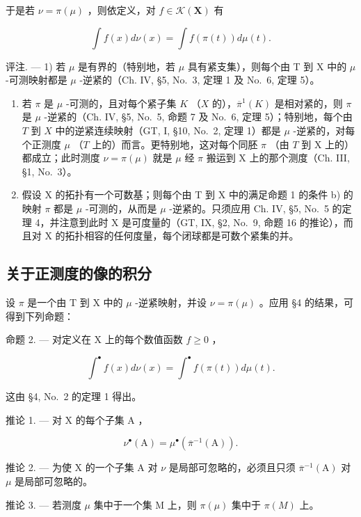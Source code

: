 于是若 \(\nu = \pi (\mu)\) ，则依定义，对 \(f\in \mathcal{K}(\mathbf{X})\) 有

\[
\int f (x) d \nu (x) = \int f (\pi (t)) d \mu (t).\tag{1}
\]

评注. --- 1) 若 \(\mu\) 是有界的（特别地，若 \(\mu\) 具有紧支集），则每个由 T 到 X 中的 \(\mu\) -可测映射都是 \(\mu\) -逆紧的（Ch. IV, §5, No.~3, 定理 1 及 No.~6, 定理 5）。

\begin{enumerate}
\def\labelenumi{\arabic{enumi})}
\setcounter{enumi}{1}
\item
  若 \(\pi\) 是 \(\mu\) -可测的，且对每个紧子集 \(K\) （\(X\) 的），\(\overline{\pi}^{1}(K)\) 是相对紧的，则 \(\pi\) 是 \(\mu\) -逆紧的（Ch. IV, §5, No.~5, 命题 7 及 No.~6, 定理 5）；特别地，每个由 \(T\) 到 \(X\) 中的逆紧连续映射（GT, I, §10, No.~2, 定理 1）都是 \(\mu\) -逆紧的，对每个正测度 \(\mu\) （\(T\) 上的）而言。更特别地，这对每个同胚 \(\pi\) （由 \(T\) 到 X 上的）都成立；此时测度 \(\nu = \pi(\mu)\) 就是 \(\mu\) 经 \(\pi\) 搬运到 X 上的那个测度（Ch. III, §1, No.~3）。
\item
  假设 X 的拓扑有一个可数基；则每个由 T 到 X 中的满足命题 1 的条件 b) 的映射 \(\pi\) 都是 \(\mu\) -可测的，从而是 \(\mu\) -逆紧的。只须应用 Ch. IV, §5, No.~5 的定理 4，并注意到此时 X 是可度量的（GT, IX, §2, No.~9, 命题 16 的推论），而且对 X 的拓扑相容的任何度量，每个闭球都是可数个紧集的并。
\end{enumerate}

\subsection{关于正测度的像的积分}

设 \(\pi\) 是一个由 T 到 X 中的 \(\mu\) -逆紧映射，并设 \(\nu = \pi(\mu)\) 。应用 §4 的结果，可得到下列命题：

命题 2. --- 对定义在 X 上的每个数值函数 \(f \geqslant 0\) ，

\[
\int^ {\bullet} f (x) d \nu (x) = \int^ {\bullet} f (\pi (t)) d \mu (t).\tag{2}
\]

这由 §4, No.~2 的定理 1 得出。

推论 1. --- 对 X 的每个子集 A ，

\[
\nu^ {\bullet} (\mathrm{A}) = \mu^ {\bullet} \left(\overline {{\pi}} ^ {- 1} (\mathrm{A})\right).
\]

推论 2. --- 为使 X 的一个子集 A 对 \(\nu\) 是局部可忽略的，必须且只须 \(\overline{\pi}^{-1}(\mathrm{A})\) 对 \(\mu\) 是局部可忽略的。

推论 3. --- 若测度 \(\mu\) 集中于一个集 M 上，则 \(\pi(\mu)\) 集中于 \(\pi(M)\) 上。

